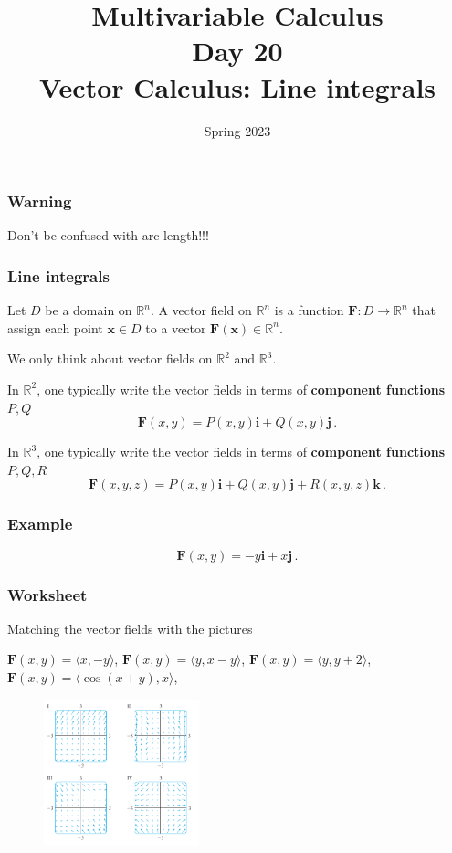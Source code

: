 \documentclass[aspectratio=169]{beamer}
\title{ Multivariable Calculus \\ Day  20 \\ Vector Calculus: Line integrals}
\date{Spring 2023}
\newcommand{\vect}{\mathbf}
\newcommand{\R}{\mathbb{R}}
\begin{document}
\maketitle

\begin{frame}
    \frametitle{ Warning}
    Don't be confused with arc length!!!
\end{frame}

\begin{frame}
    \frametitle{Line integrals}
    \begin{definition}
        Let $D$ be a domain on $\R^n$.
        A vector field on $\R^n$ is a function $\vect{F}: D \to \R^n$
        that assign each point $\vect{x}\in D$ to a vector $\vect{F}(\vect{x}) \in \R^n$.
    \end{definition}
    We only think about vector fields on $\R^2$ and $\R^3$.

    \pause

    In \(\mathbb{R}^2\), one typically write the vector fields in terms of \textbf{component functions} \(P, Q\)
\[\mathbf{F}(x,y) = P(x,y) \mathbf{i} + Q(x,y) \mathbf{j}\,.\]

    
In \(\mathbb{R}^3\), one typically write the vector fields in terms of \textbf{component functions} \(P, Q, R\)
\[\mathbf{F}(x,y,z) = P(x,y) \mathbf{i} + Q(x,y) \mathbf{j} + R(x,y,z) \mathbf{k}\,.\]

\end{frame}

\begin{frame}
    \frametitle{Example}
    $$\vect{F}(x,y) = -y \vect{i} + x \vect{j} \,.$$
\end{frame}

\begin{frame}
    \frametitle{ Worksheet   }
    Matching the vector fields with the pictures

    $\vect{F}(x,y) = \langle x, - y \rangle$, 
    $\vect{F}(x,y) = \langle y, x- y \rangle$, 
    $\vect{F}(x,y) = \langle y, y + 2 \rangle$, 
    $\vect{F}(x,y) = \langle \cos(x+y), x \rangle$, 
    \begin{figure}
        \begin{center}
            \includegraphics[width=0.4\textwidth]{vector-field.png}
        \end{center}
    \end{figure}
\end{frame}
\end{document}

